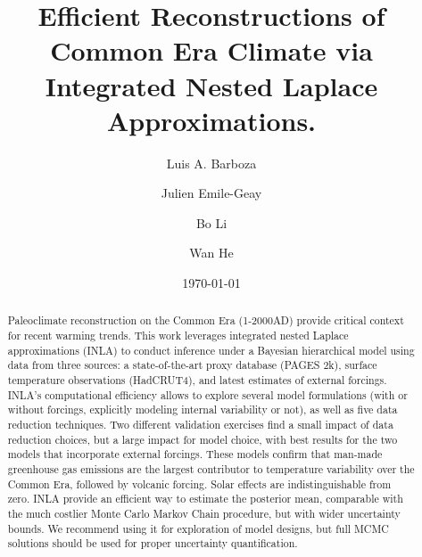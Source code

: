 \documentclass[12pt]{amsart}
\theoremstyle{plain}
\theoremstyle{definition}
\theoremstyle{remark}
\begin{document}
\doublespacing
\title[]{Efficient Reconstructions of Common Era Climate via Integrated Nested Laplace Approximations.}

\author[]{Luis A. Barboza}
\address{{\scriptsize Centro de Investigacion en Matematica Pura y Aplicada (CIMPA)-Escuela
  de Matematica, Universidad de Costa Rica\\
San Jos\'e, Costa Rica}}


\author[]{Julien Emile-Geay}
\address{{\scriptsize Department of Earth Sciences \\
  University of Southern California \\
  Los Angeles, California, USA.
}}


\author[]{Bo Li}
\address{{\scriptsize Department of Statistics \\
  University of Illinois at Urbana-Champaign \\
  Champaign, Illinois, USA.
}}

\author[]{Wan He}
\address{{\scriptsize Khoury College of Computer Sciences \\
  Northeastern University \\
  Boston, Massachussetts, USA.
}}

\date{\today}
\subjclass[2010]{}
\maketitle

\begin{abstract}
Paleoclimate reconstruction on the Common Era (1-2000AD) provide critical
context for recent warming trends. This work leverages integrated nested Laplace
approximations (INLA) to conduct inference under a Bayesian hierarchical model
using data from three sources: a state-of-the-art proxy database (PAGES 2k), surface temperature observations (HadCRUT4), and latest estimates of external forcings. 
INLA's computational efficiency allows to explore several model formulations (with or without forcings, explicitly modeling internal variability or not), as well as five data reduction techniques. Two different validation exercises find a small impact of data reduction choices, but a large impact for model choice, with best results for the two models that incorporate external forcings. These models confirm that man-made greenhouse gas emissions are the largest contributor to temperature variability over the Common Era, followed by volcanic forcing. Solar effects are indistinguishable from zero. INLA provide an efficient way to estimate the posterior mean, comparable with the much costlier Monte Carlo Markov Chain procedure, but with wider uncertainty bounds. We recommend using it for exploration of model designs, but full MCMC solutions should be used for proper uncertainty quantification.  
\end{abstract}
\end{document}
